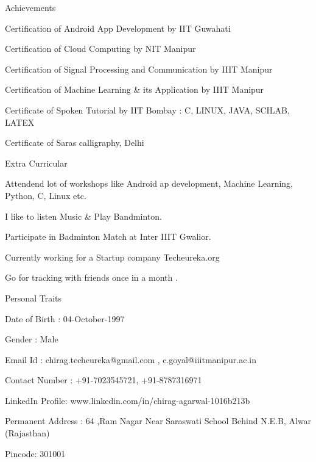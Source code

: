 \documentclass{resume} %
\begin{document}

\begin{rSection}{Achievements} 
 \itemsep -3pt

\item Certification of Android App Development by IIT Guwahati
\item Certification of Cloud Computing by NIT Manipur
\item Certification of Signal Processing and Communication by IIIT Manipur
\item Certification of Machine Learning \& its Application by IIIT Manipur
\item Certificate of Spoken Tutorial by IIT Bombay : C, LINUX, JAVA, SCILAB, LATEX

\item Certificate of Saras calligraphy, Delhi
\end{rSection}

\begin{rSection}{Extra Curricular} \itemsep -3pt
\item Attendend lot of workshops like Android ap development, Machine Learning, Python, C, Linux etc.
\item I like to listen Music \& Play Bandminton.
\item Participate in Badminton Match at Inter IIIT Gwalior.
\item Currently working for a Startup company Techeureka.org 
\item Go for tracking with friends once in a month .
\item 
\item
\item


\end{rSection}

\begin{rSection}{Personal Traits }\itemsep -3pt
\item Date of Birth : 04-October-1997
\item Gender : Male
\item Email Id : chirag.techeureka@gmail.com , c.goyal@iiitmanipur.ac.in
\item  Contact Number : +91-7023545721, +91-8787316971
\item LinkedIn Profile:  www.linkedin.com/in/chirag-agarwal-1016b213b
\item Permanent Address : 64 ,Ram Nagar Near Saraswati School Behind N.E.B, Alwar (Rajasthan)
\item Pincode: 301001

\end{rSection}
\end{document}
